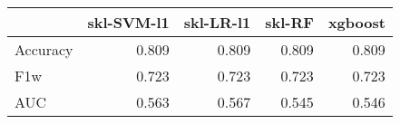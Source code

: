\begin{tabular}{lrrrr}
\toprule
{} &  skl-SVM-l1 &  skl-LR-l1 &  skl-RF &  xgboost \\
\midrule
Accuracy &       0.809 &      0.809 &   0.809 &    0.809 \\
F1w      &       0.723 &      0.723 &   0.723 &    0.723 \\
AUC      &       0.563 &      0.567 &   0.545 &    0.546 \\
\bottomrule
\end{tabular}
